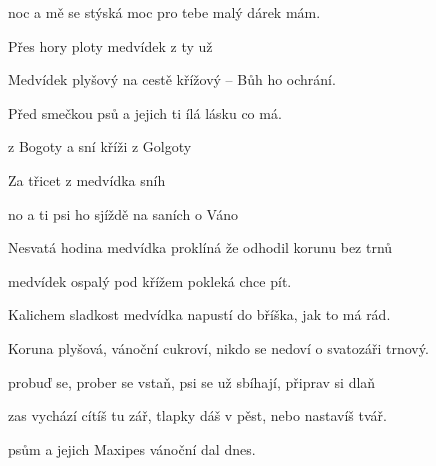 

\zs
{} noc a mě se stýská moc
pro tebe malý dárek mám.

Přes hory  ploty
medvídek z ty už 

Medvídek plyšový na cestě
křížový -- Bůh ho ochrání.

Před smečkou  psů
a jejich 
ti ílá lásku co  má.
\ks


\zr
{} z Bogoty  a sní
 kříži z Golgoty 

Za třicet 
z medvídka  sníh

no a ti  psi
ho sjíždě na saních o Váno
\kr

\zs
Nesvatá hodina medvídka proklíná
že odhodil korunu bez trnů

medvídek ospalý pod křížem pokleká
chce pít.

Kalichem sladkost medvídka
napustí do bříška, jak to má rád.

Koruna plyšová, vánoční cukroví,
nikdo se nedoví o svatozáři trnový.
\ks

\zr \kr

\zs
{} probuď se, prober se vstaň,
psi se už sbíhají, připrav si dlaň

 zas vychází cítíš tu zář,
tlapky dáš v pěst, nebo nastavíš tvář.

 psům a jejich 
Maxipes  vánoční  dal dnes.
\ks

\zr \kr

\kp






